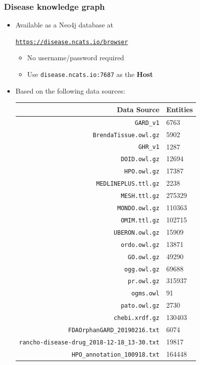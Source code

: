 ﻿\documentclass[anchorcolor=blue,linkcolor=blue]{beamer}
\begin{document}
\begin{frame}
  \frametitle{Disease knowledge graph}
  \begin{itemize}
  \item Available as a Neo4j database at
    
    \centerline{\href{https://disease.ncats.io/browser}{\texttt{https://disease.ncats.io/browser}}}
    \begin{itemize}
    \item No username/password required
    \item Use \texttt{disease.ncats.io:7687} as the \textbf{Host}
    \end{itemize}
  \item Based on the following data sources:
    \begin{center}
      \tiny
      \begin{tabular}{rl}\toprule
        Data Source & Entities\\ \midrule
        \texttt{GARD\_v1}&6763\\
        \texttt{BrendaTissue.owl.gz}&5902\\
        \texttt{GHR\_v1}&1287\\
        \texttt{DOID.owl.gz}&12694\\
        \texttt{HPO.owl.gz}&17387\\
        \texttt{MEDLINEPLUS.ttl.gz}&2238\\
        \texttt{MESH.ttl.gz}&275329\\
        \texttt{MONDO.owl.gz}&110363\\
        \texttt{OMIM.ttl.gz}&102715\\
        \texttt{UBERON.owl.gz}&15909\\
        \texttt{ordo.owl.gz}&13871\\
        \texttt{GO.owl.gz}&49290\\
        \texttt{ogg.owl.gz}&69688\\
        \texttt{pr.owl.gz}&315937\\
        \texttt{ogms.owl}&91\\
        \texttt{pato.owl.gz}&2730\\
        \texttt{chebi.xrdf.gz}&130403\\
        \texttt{FDAOrphanGARD\_20190216.txt}&6074\\
        \texttt{rancho-disease-drug\_2018-12-18\_13-30.txt}&19817\\
        \texttt{HPO\_annotation\_100918.txt}&164448\\ \bottomrule
      \end{tabular}
    \end{center}
  \end{itemize}
\end{frame}
\end{document}
